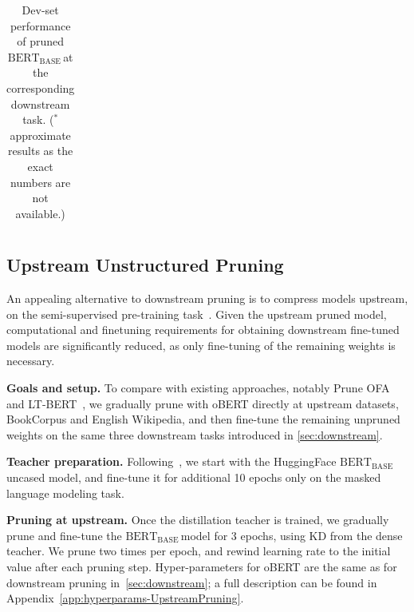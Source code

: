 \documentclass[11pt]{article}
\newcommand{\bert}{$\textrm{BERT}_{\textrm{BASE}}\,$}
\begin{document}
\begin{table}
{\begin{tabular}{ccc|cc|cc}
    \bottomrule
    \end{tabular}
    }
    \caption{Dev-set performance of pruned \bert at the corresponding downstream task. ($^*$ approximate results as the exact numbers are not available.)}
    \label{tab:10_30_gradual}
    \vspace{-1.2em}
\end{table}

\subsection{Upstream Unstructured Pruning}
\label{sec:upstream}

An appealing alternative to downstream pruning is to compress models upstream, on the semi-supervised pre-training task~\cite{zafrir2021prune}. Given the upstream pruned model, computational and finetuning requirements for obtaining downstream fine-tuned models are significantly reduced, as only fine-tuning of the remaining weights is necessary.

\noindent\textbf{Goals and setup.} To compare with existing approaches, notably Prune OFA~\cite{zafrir2021prune} and LT-BERT~\cite{Chen2020TheLT}, we gradually prune with oBERT directly at upstream datasets, BookCorpus and English Wikipedia, and then fine-tune the remaining unpruned weights on the same three downstream tasks introduced in \ref{sec:downstream}.

\noindent\textbf{Teacher preparation.} Following~\citet{Liu2019RoBERTaAR}, we start with the HuggingFace \bert uncased model, and fine-tune it for additional 10 epochs only on the masked language modeling task.

\noindent\textbf{Pruning at upstream.} Once the distillation teacher is trained, we gradually prune and fine-tune the \bert model for 3 epochs, using KD from the dense teacher. We prune two times per epoch, and rewind learning rate to the initial value after each pruning step. Hyper-parameters for oBERT are the same as for downstream pruning in~\ref{sec:downstream}; a full description can be found in Appendix~\ref{app:hyperparams-UpstreamPruning}.
\end{document}
